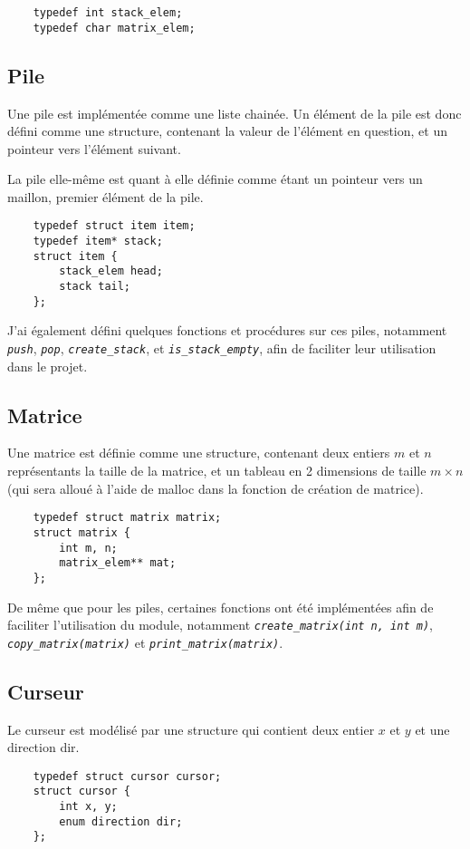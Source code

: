 \documentclass[a4paper,11pt]{article}
\newcommand{\code}[1]{{\itshape\lstinline{#1}}}
\begin{document}
\begin{lstlisting}
    typedef int stack_elem;
    typedef char matrix_elem;
\end{lstlisting}

\subsection*{Pile}
Une pile est implémentée comme une liste chainée. Un élément de la pile est donc défini comme une structure, contenant la valeur de l'élément en question, et un pointeur vers l'élément suivant.

La pile elle-même est quant à elle définie comme étant un pointeur vers un maillon, premier élément de la pile.

\begin{lstlisting}
    typedef struct item item;
    typedef item* stack;
    struct item {
        stack_elem head;
        stack tail;
    };
\end{lstlisting}

J'ai également défini quelques fonctions et procédures sur ces piles, notamment \code{push}, \code{pop}, \code{create_stack}, et \code{is_stack_empty}, afin de faciliter leur utilisation dans le projet.

\subsection*{Matrice}
Une matrice est définie comme une structure, contenant deux entiers $m$ et $n$ représentants la taille de la matrice, et un tableau en 2 dimensions de taille $m \times n$ (qui sera alloué à l'aide de malloc dans la fonction de création de matrice).

\begin{lstlisting}
    typedef struct matrix matrix;
    struct matrix {
        int m, n;
        matrix_elem** mat;
    };
\end{lstlisting}

De même que pour les piles, certaines fonctions ont été implémentées afin de faciliter l'utilisation du module, notamment \code{create_matrix(int n, int m)}, \code{copy_matrix(matrix)} et \code{print_matrix(matrix)}.

\subsection*{Curseur}
Le curseur est modélisé par une structure qui contient deux entier $x$ et $y$ et une direction dir.
\begin{lstlisting}
    typedef struct cursor cursor;
    struct cursor {
        int x, y;
        enum direction dir;
    };
\end{lstlisting}
\end{document}
